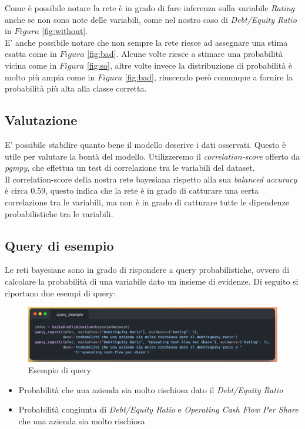 \noindent Come è possibile notare la rete è in grado di fare inferenza sulla variabile \textit{Rating} anche se non sono note delle variabili, come nel nostro caso di \textit{Debt/Equity Ratio} in $Figura$ \ref{fig:without}.
\\ E' anche possibile notare che non sempre la rete riesce ad assegnare una stima esatta come in $Figura$ \ref{fig:bad}. Alcune volte riesce a stimare una probabilità vicina come in $Figura$ \ref{fig:so}, altre volte invece la distribuzione di probabilità è molto più ampia come in $Figura$ \ref{fig:bad}, riuscendo però comunque a fornire la probabilità più alta alla classe corretta.

\subsection{Valutazione}

\noindent E' possibile stabilire quanto bene il modello descrive i dati osservati. Questo è utile per valutare la bontà del modello. Utilizzeremo il \textit{correlation-score} offerto da \textit{pgmpy}, che effettua un test di correlazione tra le variabili del dataset.\\ Il correlation-score della nostra rete bayesiana rispetto alla sua \textit{balanced accuracy} è circa $0.59$, questo indica che la rete è in grado di catturare una certa correlazione tra le variabili, ma non è in grado di catturare tutte le dipendenze probabilistiche tra le variabili.

\subsection{Query di esempio}
\noindent Le reti bayesiane sono in grado di rispondere a query probabilistiche, ovvero di calcolare la probabilità di una variabile dato un insieme di evidenze. Di seguito si riportano due esempi di query:

\begin{figure}[H]
    \centering
    \includegraphics[scale=0.5]{img/ex_query.png}
    \caption{Esempio di query}
\end{figure}

\begin{itemize}[label=-]
    \item Probabilità che una azienda sia molto rischiosa dato il \textit{Debt/Equity Ratio}
    \item Probabilità congiunta di \textit{Debt/Equity Ratio} e \textit{Operating Cash Flow Per Share} che una azienda sia molto rischiosa
\end{itemize}

